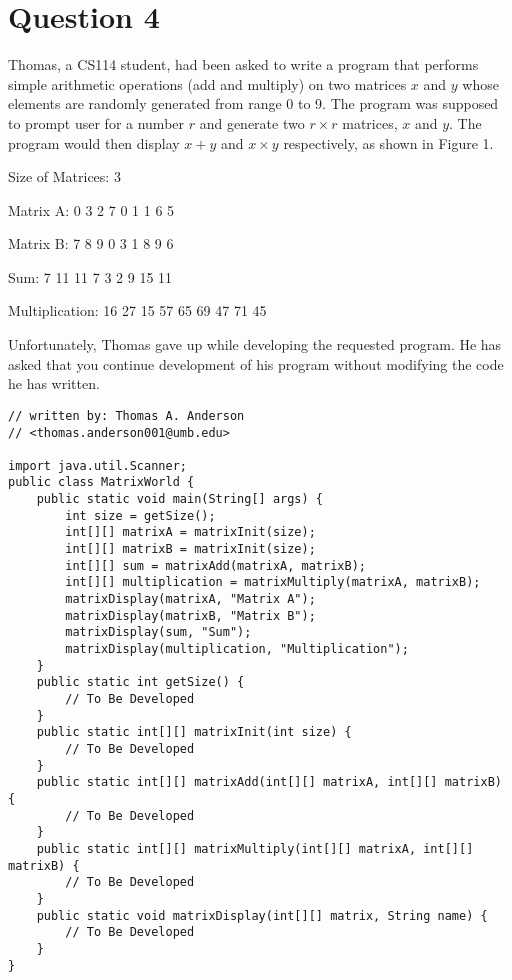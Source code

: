 \documentclass[12pt,letterpaper,twoside]{article}
\begin{document}
\section*{Question 4}

Thomas, a CS114 student, had been asked to write a program that performs simple arithmetic operations (add and multiply) on two matrices $x$ and $y$ whose elements are randomly generated from range 0 to 9.
The program was supposed to prompt user for a number $r$ and generate two $r \times r$ matrices, $x$ and $y$.
The program would then display $x + y$ and $x \times y$ respectively, as shown in Figure 1.

\newpage

\renewcommand{\lstlistingname}{Figure}
\begin{terminal}
Size of Matrices: 3

Matrix A:
  0   3   2
  7   0   1
  1   6   5

Matrix B:
  7   8   9
  0   3   1
  8   9   6

Sum:
  7  11  11
  7   3   2
  9  15  11

Multiplication:
 16  27  15
 57  65  69
 47  71  45
\end{terminal}

Unfortunately, Thomas gave up while developing the requested program.
He has asked that you continue development of his program without modifying the code he has written.

\lstset{caption=}
\lstset{language=Java,tabsize=4}
\begin{lstlisting}
// written by: Thomas A. Anderson
// <thomas.anderson001@umb.edu>

import java.util.Scanner;
public class MatrixWorld {
	public static void main(String[] args) {
		int size = getSize();
		int[][] matrixA = matrixInit(size);
		int[][] matrixB = matrixInit(size);
		int[][] sum = matrixAdd(matrixA, matrixB);
		int[][] multiplication = matrixMultiply(matrixA, matrixB);
		matrixDisplay(matrixA, "Matrix A");
		matrixDisplay(matrixB, "Matrix B");
		matrixDisplay(sum, "Sum");
		matrixDisplay(multiplication, "Multiplication");
	}
	public static int getSize() {
		// To Be Developed
	}
	public static int[][] matrixInit(int size) {
		// To Be Developed
	}
	public static int[][] matrixAdd(int[][] matrixA, int[][] matrixB) {
		// To Be Developed
	}
	public static int[][] matrixMultiply(int[][] matrixA, int[][] matrixB) {
		// To Be Developed
	}
	public static void matrixDisplay(int[][] matrix, String name) {
		// To Be Developed
	}
}
\end{lstlisting}
\end{document}
